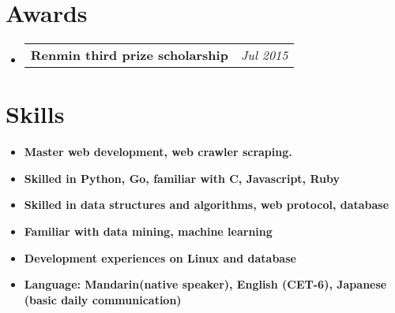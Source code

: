 \documentclass[UTF8,11pt]{article}
\makeatletter
\newcommand{\resumeItem}[2]{
  \item\small{
    \textbf{#1}{ #2 \vspace{-2pt}}
  }
}
\newcommand{\resumeSubItem}[2]{\vspace{2pt}\resumeItem{#1}{#2}\vspace{-7pt}}
\newcommand{\resumeListSubItem}[2]{
  \vspace{-1pt}\item
    \begin{tabular*}{0.97\textwidth}{l@{\extracolsep{\fill}}r}
      \textbf{#1} & \textit{\small #2} \\
    \end{tabular*}\vspace{-6pt}
}
\newcommand{\resumeSubHeadingListStart}{\begin{itemize}[leftmargin=*]}
\newcommand{\resumeSubHeadingListEnd}{\end{itemize}}\vspace{-12pt}}
\makeatother
\begin{document}
\section{Awards}
  \resumeSubHeadingListStart
    \resumeListSubItem
      { Renmin third prize scholarship}{Jul 2015}
  \resumeSubHeadingListEnd
%
\section{Skills}
  \resumeSubHeadingListStart
    \resumeSubItem{Master web development, web crawler scraping.}
      {}
    \resumeSubItem{Skilled in Python, Go, familiar with C, Javascript, Ruby}
      {}
    \resumeSubItem{Skilled in data structures and algorithms, web protocol, database}
      {}
    \resumeSubItem{Familiar with data mining, machine learning}
      {}
    \resumeSubItem{Development experiences on Linux and database}
      {}
    \resumeSubItem{Language: Mandarin(native speaker), English (CET-6), Japanese (basic daily communication)}
      {}
  \resumeSubHeadingListEnd


\end{document}
